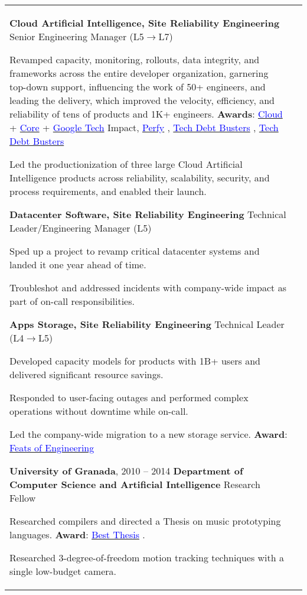 \documentclass[letterpaper,10pt,oneside]{article}
\newcommand{\DatestampY}[1]{#1}
\newcommand{\itemspacing}{\vspace{0.10cm}}
\newcommand{\sref}[2]{%
    \href{https://0/local/attachments/#1}{\textcolor{blue}{#2}}%
}
\newenvironment{body}
{\par\par
\begin{longtable}{p{0.145\textwidth}p{0.81\textwidth}}}
{\par\end{longtable}\par}
\begin{document}
\begin{body}
\phantom{g}\textbf{Cloud Artificial Intelligence, Site Reliability Engineering} \textemdash{ }Senior Engineering Manager (L5$\rightarrow$L7)
\begin{comp}
\item Revamped capacity, monitoring, rollouts, data integrity, and frameworks across the entire developer organization, garnering top-down support, influencing the work of 50+ engineers, and leading the delivery, which improved the velocity, efficiency, and reliability of tens of products and 1K+ engineers. \textbf{Awards}: \sref{Google-Award-GoogleCloudTechImpact-2022.pdf}{Cloud} + \sref{Google-Award-CoreTechImpact-2021.pdf}{Core} + \sref{Google-Award-GoogleTechImpact-2022.pdf}{Google Tech} Impact, \sref{Google-Award-Perfy.pdf}{Perfy}, \sref{Google-Award-TechDebtBusters1.pdf}{Tech Debt Busters}, \sref{Google-Award-TechDebtBusters2.pdf}{Tech Debt Busters}
\item Led the productionization of three large Cloud Artificial Intelligence products across reliability, scalability, security, and process requirements, and enabled their launch.
\end{comp}
\itemspacing

\phantom{g}\textbf{Datacenter Software, Site Reliability Engineering} \textemdash{ }Technical Leader/Engineering Manager (L5)
\begin{comp}
\item Sped up a project to revamp critical datacenter systems and landed it one year ahead of time.
\item Troubleshot and addressed incidents with company-wide impact as part of on-call responsibilities.
\end{comp}
\itemspacing

\phantom{g}\textbf{Apps Storage, Site Reliability Engineering} \textemdash{ }Technical Leader (L4$\rightarrow$L5)
\begin{comp}
\item Developed capacity models for products with 1B+ users and delivered significant resource savings.
\item Responded to user-facing outages and performed complex operations without downtime while on-call.
\item Led the company-wide migration to a new storage service. \textbf{Award}:\hspace{0.1cm}\sref{Google-Award-FeatsOfEngineering-2018.pdf}{Feats of Engineering}
\end{comp}
\itemspacing

\textbf{University of Granada}, \DatestampY{2010} -- \DatestampY{2014} \vspace{0.06cm} \newline
\phantom{g}\textbf{Department of Computer Science and Artificial Intelligence} \textemdash{ }Research Fellow
\begin{comp}
\item Researched compilers and directed a Thesis on music prototyping languages. \textbf{Award}: \sref{UGR-Award-BestMasterThesis-MusicPrototyping.pdf}{Best Thesis}.
\item Researched 3-degree-of-freedom motion tracking techniques with a single low-budget camera.
\end{comp}


\end{body}
\end{document}
